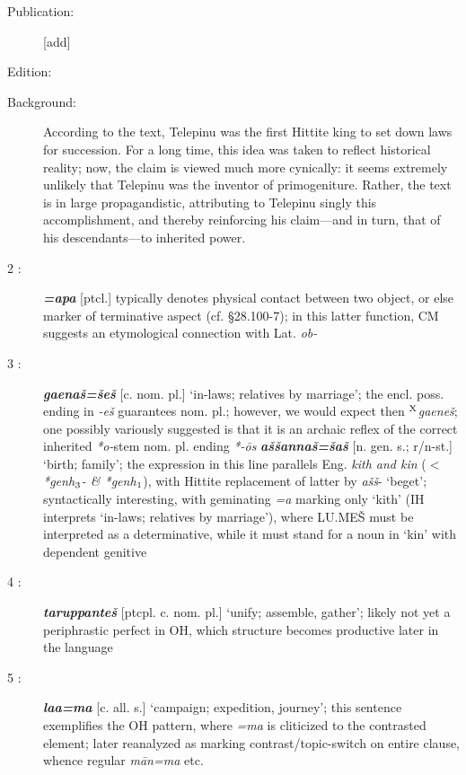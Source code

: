 \documentclass[10pt]{article}
\newcommand{\supersc}[1]{$^{\textrm{\scriptsize{#1}}}$}  	%
\newcommand{\subsc}[1]{$_{\textrm{\scriptsize{#1}}}$}	%
\newcommand{\bit}[1]{\textbf{\textit{#1}}}				%
\newcommand{\p}[1]{{\tiny[{#1}]}}					%
\newcommand{\hi}{h\subsc{1}}								%
\newcommand{\hiii}{h\subsc{3}}								%
\newcommand{\hith}{\textsubwedge{h}}
\renewcommand{\.}[1]{\textsubdot{#1}}
\begin{document}
\begin{description}

\item[Publication:] [add]
\item[Edition:] \citet{hoffmann1984telepinu}
\item[Background:] According to the text, Telepinu was the first Hittite king to set down laws for succession. For a long time, this idea was taken to reflect historical reality; now, the claim is viewed much more cynically: it seems extremely unlikely that Telepinu was the inventor of primogeniture. Rather, the text is in large propagandistic, attributing to Telepinu singly this accomplishment, and thereby reinforcing his claim---and in turn, that of his descendants---to inherited power.

\smallskip

\item[2 :] \bit{=apa} \p{ptcl.} typically denotes physical contact between two object, or else marker of terminative aspect (cf.  \S28.100-7); in this latter function, CM suggests an  etymological connection with Lat. \textit{ob-}
 
\item[3 :] \bit{gaena\v{s}=\v{s}e\v{s}} \p{c. nom. pl.} `in-laws; relatives by marriage'; the encl. poss. ending in \textit{-e\v{s}} guarantees nom. pl.; however, we would expect then \supersc{X}\textit{gaene\v{s}}; one possibly variously suggested is that it is an archaic reflex of the correct inherited \textit{*o-}stem nom. pl. ending \textit{*-\=os} \bit{{\hith}a\v{s}\v{s}anna\v{s}=\v{s}a\v{s}} \p{n. gen. s.; r/n-st.} `birth; family'; the expression in this line parallels Eng. \textit{kith and kin} ($<$ \textit{*gen{\hiii}- \& *gen{\hi}}), with Hittite replacement of latter by \textit{{\hith}a\v{s}\v{s}}- `beget'; syntactically interesting, with geminating \textit{=a} marking only `kith' (IH interprets `in-laws; relatives by marriage'), where LU.ME\v{S} must be interpreted as a determinative, while it must stand for a noun in `kin' with dependent genitive

\item[4 :] \bit{taruppante\v{s}} \p{ptcpl. c. nom. pl.} `unify; assemble, gather'; likely not yet a periphrastic perfect in OH, which structure becomes productive later in the language

\item[5 :] \bit{la{\hith\hith}a=ma} \p{c. all. s.} `campaign; expedition, journey'; this sentence exemplifies the OH pattern, where \textit{=ma} is cliticized to the contrasted element; later reanalyzed as marking contrast/topic-switch on entire clause, whence regular \textit{m\=an=ma} etc.


\end{description}
\end{document}
